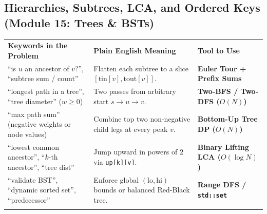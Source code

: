 \documentclass[11pt,a4paper]{article}
\begin{document}
\subsection{Hierarchies, Subtrees, LCA, and Ordered Keys (Module 15: Trees \& BSTs)}
\begingroup\footnotesize{}
\begin{tabularx}{\textwidth}{>{\raggedright\arraybackslash}p{4.4cm} >{\raggedright\arraybackslash}X >{\raggedright\arraybackslash\bfseries}p{4.0cm}}
\arrayrulecolor{primaryblue}\toprule[1.1pt]
\rowcolor{primaryblue!10}
\textcolor{primaryblue}{\textbf{Keywords in the Problem}} & \textcolor{primaryblue}{\textbf{Plain English Meaning}} & \textcolor{primaryblue}{\textbf{Tool to Use}} \\
\arrayrulecolor{codeframe}\midrule[0.6pt]
``is $u$ an ancestor of $v$?'', ``subtree sum / count'' & Flatten each subtree to a slice $[\text{tin}[v], \text{tout}[v]]$. & Euler Tour + Prefix Sums \\
``longest path in a tree'', ``tree diameter'' ($w \ge 0$) & Two passes from arbitrary start $s \to u \to v$. & Two-BFS / Two-DFS ($O(N)$) \\
``max path sum'' (negative weights or node values) & Combine top two non-negative child legs at every peak $v$. & Bottom-Up Tree DP ($O(N)$) \\
``lowest common ancestor'', ``$k$-th ancestor'', ``tree dist'' & Jump upward in powers of $2$ via \texttt{up[k][v]}. & Binary Lifting LCA ($O(\log N)$) \\
``validate BST'', ``dynamic sorted set'', ``predecessor'' & Enforce global $(\text{lo}, \text{hi})$ bounds or balanced Red-Black tree. & Range DFS / \texttt{std::set} \\
\arrayrulecolor{primaryblue}\bottomrule[1.1pt]
\end{tabularx}\endgroup
\end{document}
